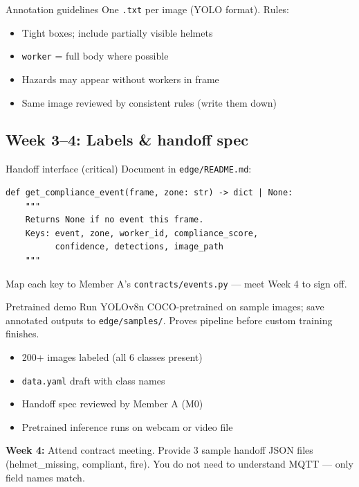 \documentclass[12pt,a4paper]{report}
\begin{document}
\begin{stepbox}{Annotation guidelines}
One \texttt{.txt} per image (YOLO format). Rules:
\begin{itemize}
    \item Tight boxes; include partially visible helmets
    \item \texttt{worker} = full body where possible
    \item Hazards may appear without workers in frame
    \item Same image reviewed by consistent rules (write them down)
\end{itemize}
\end{stepbox}

\subsection{Week 3--4: Labels \& handoff spec}

\begin{stepbox}{Handoff interface (critical)}
Document in \texttt{edge/README.md}:
\begin{verbatim}
def get_compliance_event(frame, zone: str) -> dict | None:
    """
    Returns None if no event this frame.
    Keys: event, zone, worker_id, compliance_score,
          confidence, detections, image_path
    """
\end{verbatim}
Map each key to Member A's \texttt{contracts/events.py} --- meet Week 4 to sign off.
\end{stepbox}

\begin{stepbox}{Pretrained demo}
Run YOLOv8n COCO-pretrained on sample images; save annotated outputs to \texttt{edge/samples/}. Proves pipeline before custom training finishes.
\end{stepbox}

\begin{verifybox}
\begin{itemize}
    \item[$\square$] 200+ images labeled (all 6 classes present)
    \item[$\square$] \texttt{data.yaml} draft with class names
    \item[$\square$] Handoff spec reviewed by Member A (M0)
    \item[$\square$] Pretrained inference runs on webcam or video file
\end{itemize}
\end{verifybox}

\begin{collabbox}
\textbf{Week 4:} Attend contract meeting. Provide 3 sample handoff JSON files (helmet\_missing, compliant, fire). You do not need to understand MQTT --- only field names match.
\end{collabbox}
\end{document}
